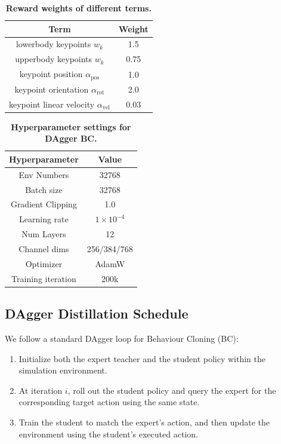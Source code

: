\documentclass{llmxive}
\begin{document}
\begin{table}[t!]
    \centering
    \begin{tabular}{cc}
    \toprule
    Term & Weight \\
    \midrule
    lowerbody keypoints $w_k$ & 1.5 \\
    upperbody keypoints $w_k$ & 0.75 \\
    keypoint position $\alpha_{\text{pos}}$ & 1.0 \\
    keypoint orientation $\alpha_{\text{rot}}$ & 2.0 \\
    keypoint linear velocity $\alpha_{\text{vel}}$ & 0.03 \\
    \bottomrule
    \end{tabular}
\caption{\textbf{Reward weights of different terms.}}
\label{tab:reward_weights}
\end{table}

\begin{table}[t!]
    \centering
    \begin{tabular}{cc}
    \toprule
    Hyperparameter & Value \\
    \midrule
    Env Numbers & 32768 \\
    Batch size & 32768 \\
    Gradient Clipping & 1.0 \\
    Learning rate & $1\times10^{-4}$ \\
    Num Layers & 12 \\
    Channel dims & 256/384/768 \\
    Optimizer & AdamW \\
    Training iteration & 200k \\
    \bottomrule
    \end{tabular}
\caption{\textbf{Hyperparameter settings for DAgger BC.}}
\label{tab:ppo_hyperparams}
\end{table}


\subsection{DAgger Distillation Schedule}
\label{subsec:dagger_details}

We follow a standard DAgger loop for Behaviour Cloning (BC):
\begin{enumerate}[leftmargin=1.5em]
\item Initialize both the expert teacher and the student policy within the simulation environment.
\item At iteration $i$, roll out the student policy and query the expert for the corresponding target action using the same state.
\item Train the student to match the expert’s action, and then update the environment using the student’s executed action.
\end{enumerate}
\end{document}
